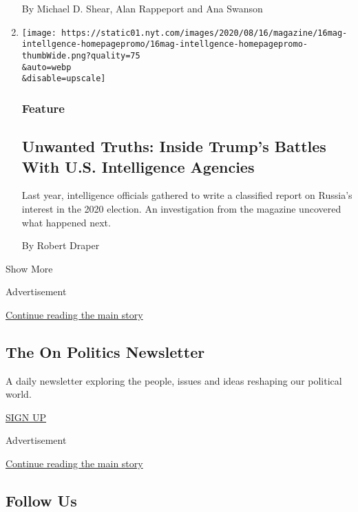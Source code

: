 \begin{enumerate}
  By Michael D. Shear, Alan Rappeport and Ana Swanson
\item
  \href{/2020/08/08/magazine/us-russia-intelligence.html}{}

  \texttt{[image: https://static01.nyt.com/images/2020/08/16/magazine/16mag-intellgence-homepagepromo/16mag-intellgence-homepagepromo-thumbWide.png?quality=75\\\&auto=webp\\\&disable=upscale]}

  \hypertarget{feature}{%
  \subsubsection{Feature}\label{feature}}

  \hypertarget{unwanted-truths-inside-trumps-battles-with-us-intelligence-agencies}{%
  \subsection{Unwanted Truths: Inside Trump's Battles With U.S.
  Intelligence
  Agencies}\label{unwanted-truths-inside-trumps-battles-with-us-intelligence-agencies}}

  Last year, intelligence officials gathered to write a classified
  report on Russia's interest in the 2020 election. An investigation
  from the magazine uncovered what happened next.

  By Robert Draper
\end{enumerate}

Show More

Advertisement

\protect\hyperlink{after-mid2}{Continue reading the main story}

\hypertarget{the-on-politics-newsletter}{%
\subsection{The On Politics
Newsletter}\label{the-on-politics-newsletter}}

A daily newsletter exploring the people, issues and ideas reshaping our
political world.

\href{/newsletters/signup/CN}{SIGN UP}

Advertisement

\protect\hyperlink{after-mktg}{Continue reading the main story}

\hypertarget{follow-us}{%
\subsection{Follow Us}\label{follow-us}}

